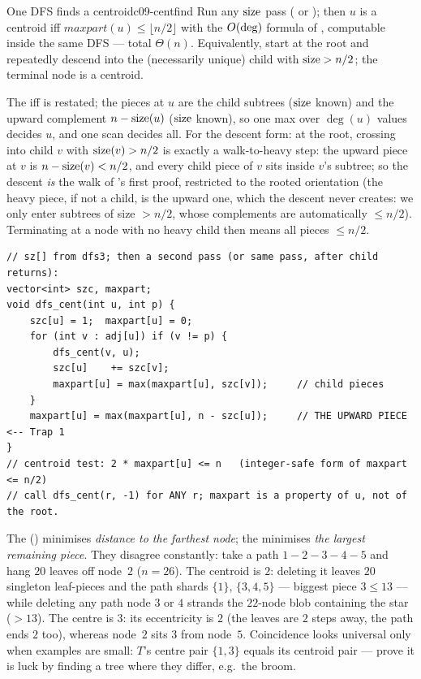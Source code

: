 \begin{theorem}{One DFS finds a centroid}{c09-centfind}
Run any $\operatorname{size}$ pass ( or ); then $u$ is a centroid
iff $\mathit{maxpart}(u) \le \lfloor n/2\rfloor$ with the $O(\deg)$ formula of
, computable inside the same DFS --- total $\Theta(n)$.
Equivalently, start at the root and repeatedly descend into the (necessarily unique)
child with $\operatorname{size} > n/2$; the terminal node is a centroid.
\end{theorem}
\begin{proofbox}
The iff is  restated; the pieces at $u$ are the child subtrees
($\operatorname{size}$ known) and the upward complement $n - \operatorname{size}(u)$ ($\operatorname{size}$ known), so one max
over $\deg(u)$ values decides $u$, and one scan decides all. For the descent form: at
the root, crossing into child $v$ with $\operatorname{size}(v) > n/2$ is exactly a walk-to-heavy step:
the upward piece at $v$ is $n - \operatorname{size}(v) < n/2$, and every child piece of $v$ sits
inside $v$'s subtree; so the descent \emph{is}
the walk of 's first proof, restricted to the rooted orientation
(the heavy piece, if not a child, is the upward one, which the descent never creates:
we only enter subtrees of size $> n/2$, whose complements are automatically $\le n/2$).
Terminating at a node with no heavy child then means all pieces $\le n/2$.
\end{proofbox}

\begin{lstlisting}[caption={maxpart in one DFS: the upward piece n - sz[u] is the line people forget}, label={lst:c09-cent}]
// sz[] from dfs3; then a second pass (or same pass, after child returns):
vector<int> szc, maxpart;
void dfs_cent(int u, int p) {
    szc[u] = 1;  maxpart[u] = 0;
    for (int v : adj[u]) if (v != p) {
        dfs_cent(v, u);
        szc[u]    += szc[v];
        maxpart[u] = max(maxpart[u], szc[v]);     // child pieces
    }
    maxpart[u] = max(maxpart[u], n - szc[u]);     // THE UPWARD PIECE  <-- Trap 1
}
// centroid test: 2 * maxpart[u] <= n   (integer-safe form of maxpart <= n/2)
// call dfs_cent(r, -1) for ANY r; maxpart is a property of u, not of the root.
\end{lstlisting}

\begin{insightbox}
The  () minimises \emph{distance to the farthest node};
the  minimises \emph{the largest remaining piece}. They disagree constantly:
take a path $1-2-3-4-5$ and hang $20$ leaves off node~$2$ ($n = 26$). The centroid is $2$:
deleting it leaves $20$ singleton leaf-pieces and the path shards $\{1\}$, $\{3,4,5\}$
--- biggest piece $3 \le 13$ --- while deleting any path node $3$ or $4$ strands the
$22$-node blob containing the star ($> 13$). The centre is $3$: its eccentricity is
$2$ (the leaves are $2$ steps away, the path ends $2$ too), whereas node~$2$ sits $3$
from node~$5$. Coincidence looks universal only when
examples are small: $T$'s centre pair $\{1,3\}$ equals its centroid pair --- prove it is
luck by finding a tree where they differ, e.g.\ the broom.
\end{insightbox}

